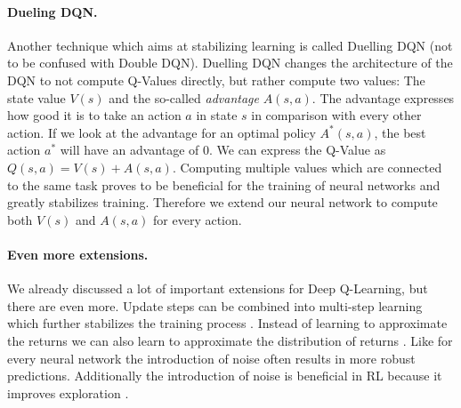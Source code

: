 \paragraph{Dueling DQN.}
Another technique which aims at stabilizing learning is called Duelling DQN \cite{wang2015dueling} (not to be confused with Double DQN). Duelling DQN changes the architecture of the DQN to not compute Q-Values directly, but rather compute two values: The state value $V(s)$ and the so-called \textit{advantage} $A(s, a)$. The advantage expresses how good it is to take an action $a$ in state $s$ in comparison with every other action. If we look at the advantage for an optimal policy $A^*(s, a)$, the best action $a^*$ will have an advantage of 0. We can express the Q-Value as $Q(s, a) = V(s) + A(s, a)$. Computing multiple values which are connected to the same task proves to be beneficial for the training of neural networks and greatly stabilizes training. Therefore we extend our neural network to compute both $V(s)$ and $A(s, a)$ for every action. \cite{caruana1997multitask, collobert2008unified} 

\paragraph{Even more extensions.}
We already discussed a lot of important extensions for Deep Q-Learning, but there are even more. Update steps can be combined into multi-step learning which further stabilizes the training process \cite{sutton1988learning}. Instead of learning to approximate the returns we can also learn to approximate the distribution of returns \cite{bellemare2017distributional}. Like for every neural network the introduction of noise often results in more robust predictions. Additionally the introduction of noise is beneficial in RL because it improves exploration \cite{fortunato2017noisy, plappert2017parameter}.

